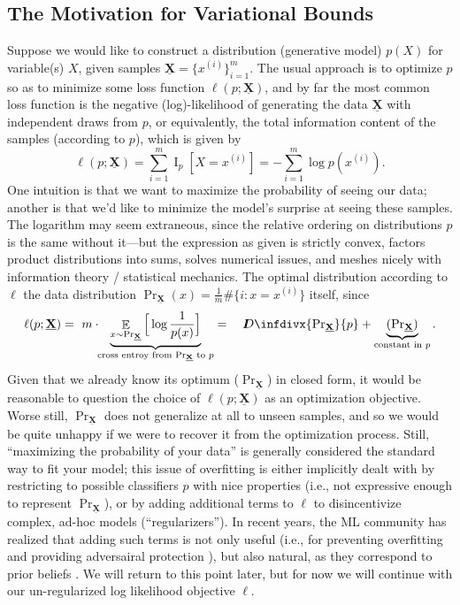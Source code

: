 \documentclass{article}
\theoremstyle{plain}
\theoremstyle{definition}
\theoremstyle{remark}
\let\H\relax
\DeclareMathOperator{\H}{\mathrm{H}} %
\DeclareMathOperator{\I}{\mathrm{I}} %
\DeclareMathOperator*{\Ex}{\mathbb{E}} %
\newcommand\mat[1]{\mathbf{#1}}
\newcommand{\thickD}{I\mkern-8muD}
\newcommand{\kldiv}{\thickD\infdivx}
\newcommand{\datadist}[1]{\Pr\nolimits_{#1}}
\begin{document}
\subsection{The Motivation for Variational Bounds}
	\label{sec:intro-to-variational-inference}
\def\xsamp{{\underline{\mat X}}}

Suppose we would like to construct a distribution (generative model) $p(X)$ for variable(s) $X$, given samples $\xsamp = \{ x^{(i)} \}_{i=1}^m$. The usual approach is to optimize $p$ so as to minimize some loss function $\ell(p; \xsamp)$, and by far the most common loss function is the negative (log)-likelihood of generating the data $\xsamp$ with independent draws from $p$, or equivalently, the total information content of the samples (according to $p$), which is given by 
\begin{equation}
 	\ell(p; \xsamp) = \sum_{i=1}^m \I_p[ X = x^{(i)}]  %
	= -\sum_{i=1}^m \log p(x^{(i)}). \label{eq:negloglike} \end{equation}
One intuition is that we want to maximize the probability of seeing our data; another is that we'd like to minimize the model's surprise at seeing these samples.%
The logarithm may seem extraneous, since the relative ordering on distributions $p$ is the same without it---but the expression as given is strictly convex, factors product distributions into sums, solves numerical issues, and meshes nicely with information theory / statistical mechanics.
The optimal distribution according to $\ell$ the data distribution 
$\datadist\xsamp(x) = \frac1m \#\{i : x = x^{(i)}\}$  itself, since
\[ 
	\ell(p; \xsamp) =~ m \cdot\!\! \underbrace{\Ex_{x \sim \datadist\xsamp} \Big[ \log \frac1{p(x)}\Big] }_{\text{cross entroy from $\datadist\xsamp$ to $p$}} =\quad \kldiv{\datadist\xsamp}{p} + \underbrace{\H(\datadist\xsamp)}_{\text{constant in $p$}}. 
\] 
Given that we already know its optimum ($\datadist\xsamp$) in closed form, it would be reasonable to question the choice of $\ell(p;\xsamp)$ as an optimization objective. Worse still, $\datadist\xsamp$ does not generalize at all to unseen samples, and so we would be quite unhappy if we were to recover it from the optimization process. 
Still, ``maximizing the probability of your data'' is generally considered the standard way to fit your model; this issue of overfitting is either implicitly dealt with by  restricting to possible classifiers $p$ with nice properties (i.e., not expressive enough to represent $\datadist\xsamp$), or by adding additional terms to $\ell$ to disincentivize complex, ad-hoc models (``regularizers'').
In recent years, the ML community has realized that adding such terms is not only useful (i.e., for preventing overfitting \cite{} and providing adversairal protection \cite{}), but also natural, as they correspond to prior beliefs \cite{}.
We will return to this point later, but for now we will continue with our un-regularized log likelihood objective $\ell$.
\end{document}
